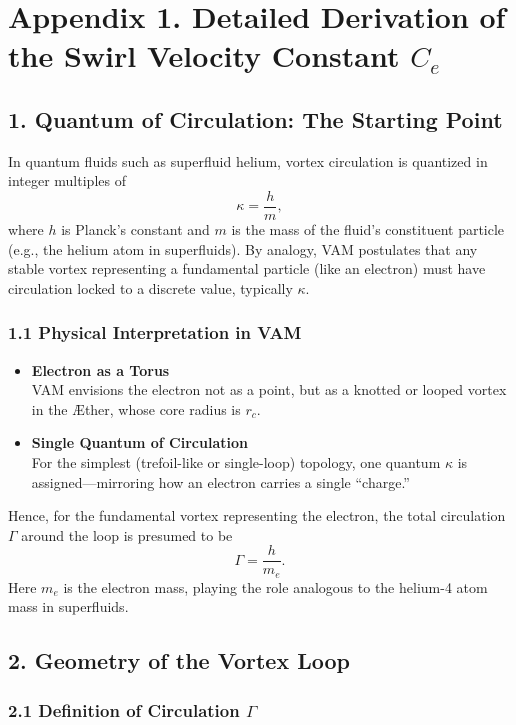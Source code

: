 
\section*{Appendix 1. Detailed Derivation of the Swirl Velocity Constant \(C_e\)}

\subsection*{1. Quantum of Circulation: The Starting Point}

In quantum fluids such as superfluid helium, vortex circulation is quantized in integer multiples of
\[
    \kappa = \frac{h}{m},
\]
where \(h\) is Planck’s constant and \(m\) is the mass of the fluid’s constituent particle (e.g., the helium atom in superfluids). By analogy, VAM postulates that any stable vortex representing a fundamental particle (like an electron) must have circulation locked to a discrete value, typically \(\kappa\).

\subsubsection*{1.1 Physical Interpretation in VAM}
\begin{itemize}
    \item \textbf{Electron as a Torus} \\
    VAM envisions the electron not as a point, but as a knotted or looped vortex in the Æther, whose core radius is \(r_c\).
    \item \textbf{Single Quantum of Circulation} \\
    For the simplest (trefoil-like or single-loop) topology, one quantum \(\kappa\) is assigned—mirroring how an electron carries a single “charge.”
\end{itemize}

Hence, for the fundamental vortex representing the electron, the total circulation \(\Gamma\) around the loop is presumed to be
\[
    \Gamma = \frac{h}{m_e}.
\]
Here \(m_e\) is the electron mass, playing the role analogous to the helium-4 atom mass in superfluids.

\subsection*{2. Geometry of the Vortex Loop}

\subsubsection*{2.1 Definition of Circulation \(\Gamma\)}

